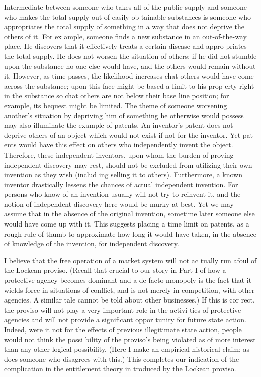 \documentclass[11pt,openany]{book}
\begin{document}
Intermediate between someone who takes all of the public supply and someone who makes the total supply out of easily ob tainable substances is someone who appropriates the total supply of something in a way that does not deprive the others of it. For ex ample, someone finds a new substance in an out-of-the-way place. He discovers that it effectively treats a certain disease and appro priates the total supply. He does not worsen the situation of others; if he did not stumble upon the substance no one else would have, and the others would remain without it. However, as time passes, the likelihood increases chat others would have come across the substance; upon this face might be based a limit to his prop erty right in the substance so chat others are not below their base line position; for example, its bequest might be limited. The theme of someone worsening another's situation by depriving him of something he otherwise would possess may also illuminate the example of patents. An inventor's patent does not deprive others of an object which would not exist if not for the inventor. Yet pat ents would have this effect on others who independently invent the object. Therefore, these independent inventors, upon whom the burden of proving independent discovery may rest, should not be excluded from utilizing their own invention as they wish (includ ing selling it to others). Furthermore, a known inventor drastically lessens the chances of actual independent invention. For persons who know of an invention usually will not try to reinvent it, and the notion of independent discovery here would be murky at best. Yet we may assume that in the absence of the original invention, sometime later someone else would have come up with it. This suggests placing a time limit on patents, as a rough rule of thumb to approximate how long it would have taken, in the absence of knowledge of the invention, for independent discovery. 

I believe that the free operation of a market system will not ac tually run afoul of the Lockean proviso. (Recall that crucial to our story in Part I of how a protective agency becomes dominant and a de facto monopoly is the fact that it wields force in situations of conflict, and is not merely in competition, with other agencies. A similar tale cannot be told about other businesses.) If this is cor rect, the proviso will not play a very important role in the activi ties of protective agencies and will not provide a significant oppor tunity for future state action. Indeed, were it not for the effects of previous illegitimate state action, people would not think the possi bility of the proviso's being violated as of more interest than any other logical possibility. (Here I make an empirical historical claim; as does someone who disagrees with this.) This completes our indication of the complication in the entitlement theory in troduced by the Lockean proviso. 
\end{document}
